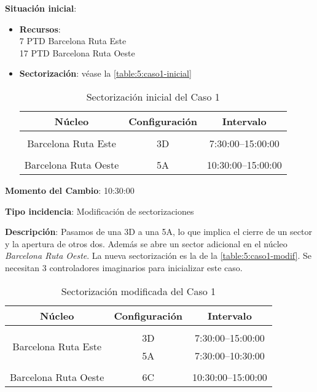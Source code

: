 \textbf{Situación inicial}:
\begin{itemize}[label={}]
		
	\item \textbf{Recursos}: \\
	7 PTD Barcelona Ruta Este \\
	17 PTD Barcelona Ruta Oeste
	
	
	\item \textbf{Sectorización}: véase la \autoref{table:5:caso1-inicial}
	\begin{table}[h]
		\centering
		\caption{Sectorización inicial del Caso 1}
		\begin{tabular}{ccc}
			\hline
			\textbf{Núcleo}      & \textbf{Configuración} & \textbf{Intervalo}   \\ \hline
			\multicolumn{1}{l}{} & \multicolumn{1}{l}{}   & \multicolumn{1}{l}{} \\
			Barcelona Ruta Este  & 3D                     & 7:30:00--15:00:00    \\
			\multicolumn{1}{l}{} & \multicolumn{1}{l}{}   & \multicolumn{1}{l}{} \\
			Barcelona Ruta Oeste & 5A                     & 10:30:00--15:00:00   \\ \hline
		\end{tabular}
		\label{table:5:caso1-inicial}
	\end{table}
	
\end{itemize}

\textbf{Momento del Cambio}: 10:30:00

\textbf{Tipo incidencia}: Modificación de sectorizaciones

\textbf{Descripción}: Pasamos de una 3D a una 5A, lo que implica el cierre de un sector y la apertura de otros dos. Además se abre un sector adicional en el núcleo \textit{Barcelona Ruta Oeste}. La nueva sectorización es la de la \autoref{table:5:caso1-modif}. Se necesitan 3 controladores imaginarios para inicializar este caso.

\begin{table}[h]
	\centering
	\caption{Sectorización modificada del Caso 1}
	\begin{tabular}{ccc}
		\hline
		\textbf{Núcleo}                                           & \textbf{Configuración} & \textbf{Intervalo}   \\ \hline
		\multicolumn{1}{l}{}                                      & \multicolumn{1}{l}{}   & \multicolumn{1}{l}{} \\
		\multicolumn{1}{c|}{\multirow{2}{*}{Barcelona Ruta Este}} & 3D                     & 7:30:00--15:00:00    \\
		\multicolumn{1}{c|}{}                                     & 5A                     & 7:30:00--10:30:00    \\
		\multicolumn{1}{l}{}                                      & \multicolumn{1}{l}{}   & \multicolumn{1}{l}{} \\
		Barcelona Ruta Oeste                                      & 6C                     & 10:30:00--15:00:00   \\ \hline
	\end{tabular}
	\label{table:5:caso1-modif}
\end{table}


